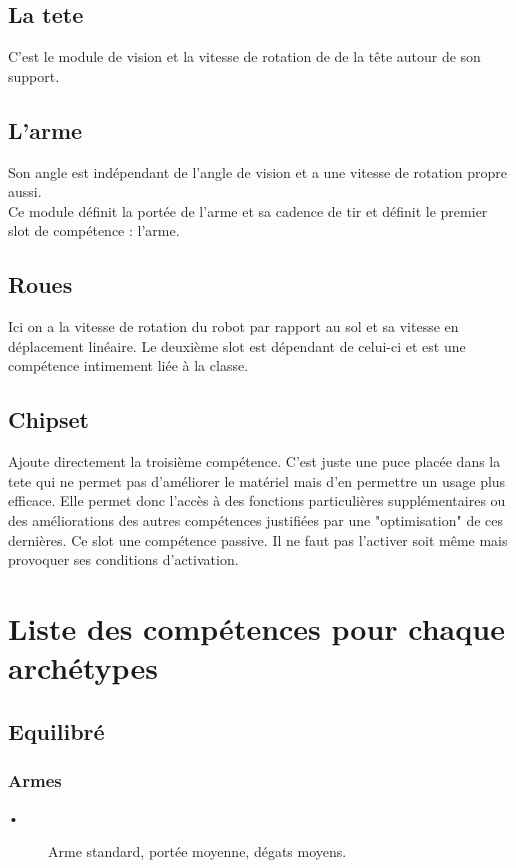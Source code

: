 \documentclass[10pt]{article}
\begin{document}
\subsection{La tete}

C'est le module de vision et la vitesse de rotation de de la tête autour de son support.


\subsection{L'arme}

Son angle est indépendant de l'angle de vision et a une vitesse de rotation propre aussi. \\
Ce module définit la portée de l'arme et sa cadence de tir et définit le premier slot de compétence : l'arme.

\subsection{Roues}

Ici on a la vitesse de rotation du robot par rapport au sol et sa vitesse en déplacement linéaire.
Le deuxième slot est dépendant de celui-ci et est une compétence intimement liée à la classe.

\subsection{Chipset}

Ajoute directement la troisième compétence. C'est juste une puce placée dans la tete qui ne permet pas d'améliorer le matériel mais d'en permettre un usage plus efficace. Elle permet donc l'accès à des fonctions particulières supplémentaires ou des améliorations des autres compétences justifiées par une "optimisation" de ces dernières. Ce slot une compétence passive. Il ne faut pas l'activer soit même mais provoquer ses conditions d'activation.
\newpage
\section{Liste des compétences pour chaque archétypes}

\subsection{Equilibré}
\subsubsection*{Armes}
\begin{description}
\item [•]Arme standard, portée moyenne, dégats moyens.
\end{description}
\end{document}
